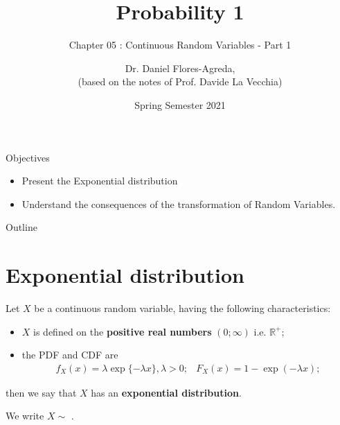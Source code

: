 \documentclass[smaller]{beamer}\usepackage[]{graphicx}\usepackage[]{color}
\newcommand{\bea}{\begin{eqnarray}}
\newcommand{\eea}{\end{eqnarray}}
\newcommand{\nn}{\nonumber}
\begin{document}
\title[S110015]{Probability 1}
\subtitle{Chapter 05 : Continuous Random Variables - Part 1}
\author[Flores-Agreda, La Vecchia]{Dr. Daniel Flores-Agreda, \\[0.5em] \tiny{(based on the notes of Prof. Davide La Vecchia)}}
\date{Spring Semester 2021}

\begin{frame}
\titlepage
\end{frame}


\begin{frame}{Objectives}

\begin{itemize}
\item Present the Exponential distribution \bigskip
\item Understand the consequences of the transformation of Random Variables.
\end{itemize}

\end{frame}

\begin{frame}{Outline}
\tableofcontents
\end{frame}

\section{Exponential distribution}

\begin{frame}{\secname}
  \begin{definition}
  Let $X$ be a  continuous random variable, having the following  characteristics:
  \begin{itemize}
  \item $X$ is defined on the \textbf{positive real numbers} $\left( 0;\infty \right)$ i.e. $\mathbb{R}^+$;
  \item the PDF and CDF are
  \bea
  f_X(x)=\lambda \exp\{ -\lambda x\},\lambda
  >0; &
  F_X(x)=1-\exp (-\lambda x); \nn \eea
  \end{itemize}
  then we say that $X$ has an \textbf{exponential distribution}.\bigskip

  We write $X\sim$ .
  \end{definition}
\end{frame}
\end{document}
